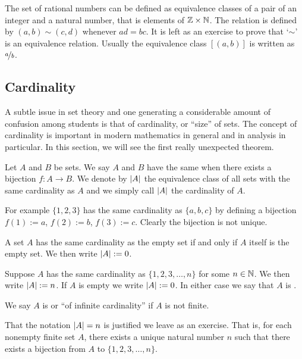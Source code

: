 \begin{example} \label{example:ratnums}
The set of rational numbers can be defined as equivalence classes of
a pair of an integer and a natural number,
that is elements of ${\mathbb{Z}} \times {\mathbb{N}}$.  The relation
is defined by $(a,b) \sim (c,d)$ whenever $ad = bc$.
It is left as an exercise to prove that `$\sim$' is an equivalence relation.
Usually the equivalence class $[(a,b)]$ is written as $\nicefrac{a}{b}$.
\end{example}

\subsection{Cardinality}

A subtle issue in set theory and one generating a considerable amount of
confusion among students is that of cardinality, or ``size'' of sets.  The
concept of cardinality is important in modern mathematics in general and
in analysis in particular.  In this section, we will see the first really
unexpected theorem.

\begin{defn}
Let $A$ and $B$ be sets.  We say $A$ and $B$ have the same
\emph{}
when there exists a bijection $f \colon A \to B$.  We denote
by $\left\lvert {A} \right\rvert$  the equivalence class of all sets with the same cardinality as
$A$ and we simply call $\left\lvert {A} \right\rvert$ the cardinality of $A$.
\end{defn}

For example $\{ 1,2,3 \}$ has the same cardinality as $\{ a,b,c \}$ by
defining a bijection $f(1) := a$, $f(2) := b$, $f(3) := c$.  Clearly the
bijection is not unique.

A set $A$ has the same cardinality as the empty set if and only
if $A$ itself is the empty set.  We then write $\left\lvert {A} \right\rvert := 0$.

\begin{defn}
Suppose $A$ has the same cardinality as $\{ 1,2,3,\ldots,n \}$
for some $n \in {\mathbb{N}}$.
We then write $\left\lvert {A} \right\rvert := n$.  If $A$ is empty we write $\left\lvert {A} \right\rvert := 0$.
In either case we say that $A$ is
\emph{}.

We say $A$ is \emph{} or ``of infinite cardinality''
if $A$ is not finite.
\end{defn}

That the notation $\left\lvert {A} \right\rvert = n$ is justified we leave as an exercise.  That
is, for each nonempty finite set $A$, there exists a unique natural number
$n$ such that there exists a bijection from $A$ to $\{ 1,2,3,\ldots,n \}$.


